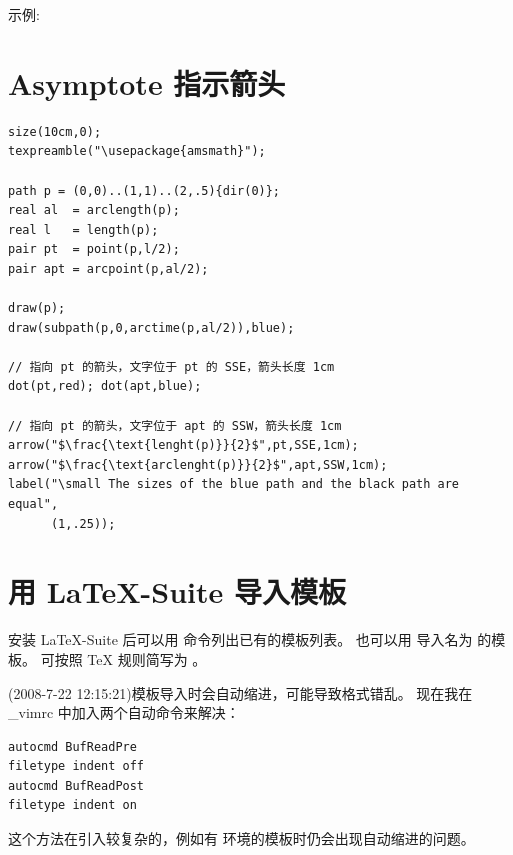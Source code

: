 \documentclass[a4paper,11pt]{article}
\begin{document}
\vspace{3mm}
示例: {\LARGE{}}


\section{Asymptote 指示箭头}
\begin{Verbatim}
size(10cm,0);
texpreamble("\usepackage{amsmath}");

path p = (0,0)..(1,1)..(2,.5){dir(0)};
real al  = arclength(p);
real l   = length(p);
pair pt  = point(p,l/2);
pair apt = arcpoint(p,al/2);

draw(p);
draw(subpath(p,0,arctime(p,al/2)),blue);

// 指向 pt 的箭头，文字位于 pt 的 SSE，箭头长度 1cm
dot(pt,red); dot(apt,blue); 

// 指向 pt 的箭头，文字位于 apt 的 SSW，箭头长度 1cm
arrow("$\frac{\text{lenght(p)}}{2}$",pt,SSE,1cm);
arrow("$\frac{\text{arclenght(p)}}{2}$",apt,SSW,1cm);
label("\small The sizes of the blue path and the black path are equal",
      (1,.25));
\end{Verbatim}

\section{用 \LaTeX -Suite 导入模板}
安装 LaTeX{}-Suite 后可以用  命令列出已有的模板列表。%
也可以用 \mbox{} 导入名为  的模板。
 可按照 \TeX{} 规则简写为  。

(2008-7-22 12:15:21)模板导入时会自动缩进，可能导致格式错乱。
现在我在 \_vimrc 中加入两个自动命令来解决：
\begin{Verbatim}
autocmd BufReadPre
filetype indent off
autocmd BufReadPost
filetype indent on
\end{Verbatim}
这个方法在引入较复杂的，例如有  环境的模板时仍会出现自动缩进的问题。
\end{document}
